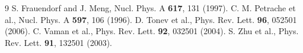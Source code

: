 \documentclass[aps,prl,reprint,superscriptaddress,nofootinbib,amsmath,amssymb]{revtex4-2}
\begin{document}
\begin{thebibliography}{9}
 S. Frauendorf and J. Meng, Nucl. Phys. A \textbf{617}, 131 (1997).
 C. M. Petrache et al., Nucl. Phys. A \textbf{597}, 106 (1996).
 D. Tonev et al., Phys. Rev. Lett. \textbf{96}, 052501 (2006).
 C. Vaman et al., Phys. Rev. Lett. \textbf{92}, 032501 (2004).
 S. Zhu et al., Phys. Rev. Lett. \textbf{91}, 132501 (2003).
\end{thebibliography}
\end{document}
